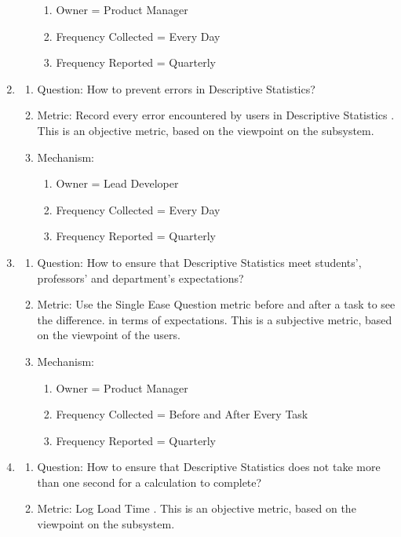 \documentclass[11pt]{article}
\begin{document}
\begin{enumerate}
\begin{enumerate}
\begin{enumerate}
    \item Owner = Product Manager
    \item Frequency Collected = Every Day
    \item Frequency Reported = Quarterly
    \end{enumerate}
\end{enumerate}
\item
	\begin{enumerate}
    \item Question: How to prevent errors in Descriptive Statistics?
    \item Metric: Record every error encountered by users in Descriptive Statistics \cite{seeley}. This is an objective metric, based on the viewpoint on the subsystem.
    \item Mechanism:
	\begin{enumerate}
    \item Owner = Lead Developer
    \item Frequency Collected = Every Day
    \item Frequency Reported = Quarterly
    \end{enumerate}
\end{enumerate}
\item
	\begin{enumerate}
    \item Question: How to ensure that Descriptive Statistics meet students', professors' and department's expectations?
    \item Metric: Use the Single Ease Question metric \cite{mifsud} before and after a task to see the difference. in terms of expectations. This is a subjective metric, based on the viewpoint of the users.
    \item Mechanism:
	\begin{enumerate}
    \item Owner = Product Manager
    \item Frequency Collected = Before and After Every Task
    \item Frequency Reported = Quarterly
    \end{enumerate}
\end{enumerate}
\item
	\begin{enumerate}
    \item Question: How to ensure that Descriptive Statistics does not take more than one second for a calculation to complete?
    \item Metric: Log Load Time \cite{west}. This is an objective metric, based on the viewpoint on the subsystem.

\end{enumerate}
\end{enumerate}
\end{document}
